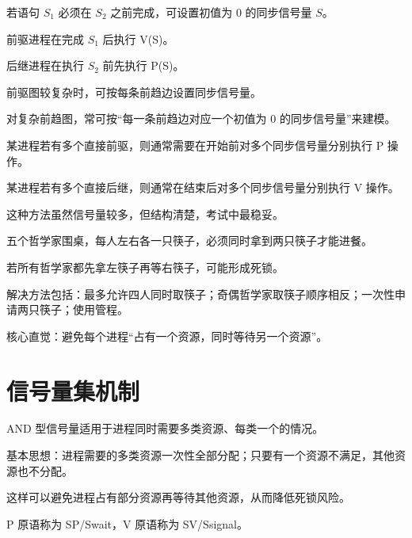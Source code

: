 \begin{points}
  \item 若语句 $S_1$ 必须在 $S_2$ 之前完成，可设置初值为 0 的同步信号量 $S$。
  \item 前驱进程在完成 $S_1$ 后执行 V(S)。
  \item 后继进程在执行 $S_2$ 前先执行 P(S)。
  \item 前驱图较复杂时，可按每条前趋边设置同步信号量。
\end{points}


\begin{points}
  \item 对复杂前趋图，常可按“每一条前趋边对应一个初值为 0 的同步信号量”来建模。
  \item 某进程若有多个直接前驱，则通常需要在开始前对多个同步信号量分别执行 P 操作。
  \item 某进程若有多个直接后继，则通常在结束后对多个同步信号量分别执行 V 操作。
  \item 这种方法虽然信号量较多，但结构清楚，考试中最稳妥。
\end{points}


\begin{points}
  \item 五个哲学家围桌，每人左右各一只筷子，必须同时拿到两只筷子才能进餐。
  \item 若所有哲学家都先拿左筷子再等右筷子，可能形成死锁。
  \item 解决方法包括：最多允许四人同时取筷子；奇偶哲学家取筷子顺序相反；一次性申请两只筷子；使用管程。
  \item 核心直觉：避免每个进程“占有一个资源，同时等待另一个资源”。
\end{points}


\section{信号量集机制}
\begin{points}
  \item AND 型信号量适用于进程同时需要多类资源、每类一个的情况。
  \item 基本思想：进程需要的多类资源一次性全部分配；只要有一个资源不满足，其他资源也不分配。
  \item 这样可以避免进程占有部分资源再等待其他资源，从而降低死锁风险。
  \item P 原语称为 SP/Swait，V 原语称为 SV/Ssignal。
\end{points}


